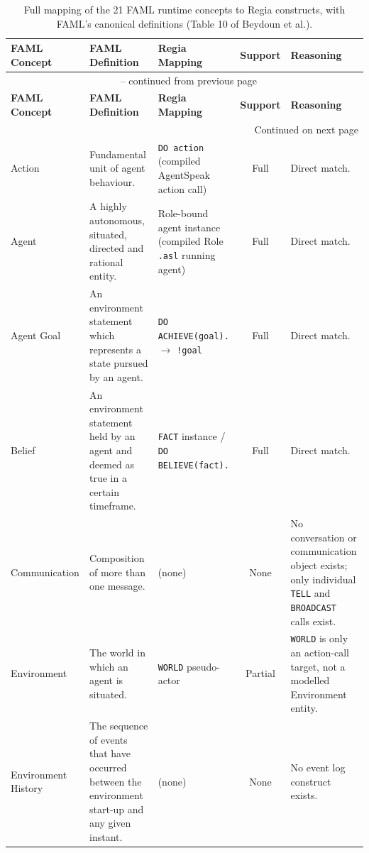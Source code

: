 \begin{longtable}{|p{}|p{}|p{}|c|p{}|}
\caption{Full mapping of the 21 FAML runtime concepts to Regia constructs, with FAML's canonical definitions (Table 10 of Beydoun et al.).}
\label{tab:faml-runtime-mapping} \\
\hline
\textbf{FAML Concept} & \textbf{FAML Definition} & \textbf{Regia Mapping} & \textbf{Support} & \textbf{Reasoning} \\
\hline
\endfirsthead
\multicolumn{5}{c}{{\tablename\ \thetable{} -- continued from previous page}} \\
\hline
\textbf{FAML Concept} & \textbf{FAML Definition} & \textbf{Regia Mapping} & \textbf{Support} & \textbf{Reasoning} \\
\hline
\endhead
\hline \multicolumn{5}{r}{{Continued on next page}} \\
\endfoot
\hline
\endlastfoot

Action &
Fundamental unit of agent behaviour. &
\lstinline|DO action| (compiled AgentSpeak action call) &
Full &
Direct match. \\
\hline

Agent &
A highly autonomous, situated, directed and rational entity. &
Role-bound agent instance (compiled Role \lstinline|.asl| running agent) &
Full &
Direct match. \\
\hline

Agent Goal &
An environment statement which represents a state pursued by an agent. &
\lstinline|DO ACHIEVE(goal).| $\rightarrow$ \lstinline|!goal| &
Full &
Direct match. \\
\hline

Belief &
An environment statement held by an agent and deemed as true in a certain timeframe. &
\lstinline|FACT| instance / \lstinline|DO BELIEVE(fact).| &
Full &
Direct match. \\
\hline

Communication &
Composition of more than one message. &
(none) &
None &
No conversation or communication object exists; only individual \lstinline|TELL| and \lstinline|BROADCAST| calls exist. \\
\hline

Environment &
The world in which an agent is situated. &
\lstinline|WORLD| pseudo-actor &
Partial &
\lstinline|WORLD| is only an action-call target, not a modelled Environment entity. \\
\hline

Environment History &
The sequence of events that have occurred between the environment start-up and any given instant. &
(none) &
None &
No event log construct exists. \\
\hline


\end{longtable}
